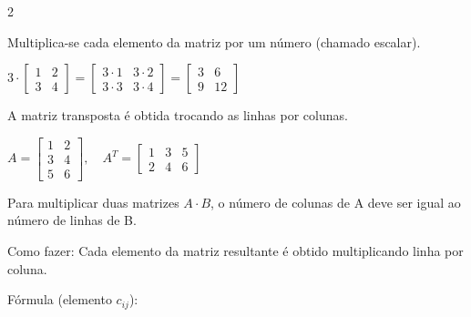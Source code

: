 \documentclass[12pt]{article}
\begin{document}
\begin{multicols}{2}

Multiplica-se cada elemento da matriz por um número (chamado escalar).


\vspace{0.3cm}

$
3 \cdot \begin{bmatrix} 1 & 2 \\ 3 & 4 \end{bmatrix} = \begin{bmatrix} 3 \cdot 1 & 3 \cdot 2 \\ 3 \cdot 3 & 3 \cdot 4 \end{bmatrix} = \begin{bmatrix} 3 & 6 \\ 9 & 12 \end{bmatrix}
$


A matriz transposta é obtida trocando as linhas por colunas. 


\vspace{0.3cm}

$ A = \begin{bmatrix} 1 & 2 \\ 3 & 4 \\5 & 6 \end{bmatrix}, \quad
A^T = \begin{bmatrix} 1 & 3 &5 \\ 2 & 4 &6\end{bmatrix} $


Para multiplicar duas matrizes $A \cdot B$, o número de colunas de A deve ser igual ao número de linhas de B.

Como fazer: Cada elemento da matriz resultante é obtido multiplicando linha por coluna.

Fórmula (elemento $c_{ij}$):


\vspace{0.3cm}


\end{multicols}
\end{document}
